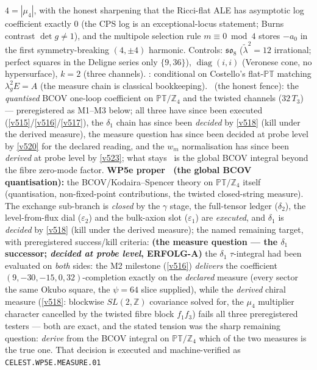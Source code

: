 \documentclass[11pt,a4paper]{article}
\newcommand{\Z}{\mathbb Z}
\begin{document}
\begin{itemize}
\begin{itemize}
$4=|\mu_4|$, with the honest sharpening that the Ricci-flat ALE has asymptotic log coefficient
exactly $0$ (the CPS log is an exceptional-locus statement; Burns contrast $\det g\neq1$), and
the multipole selection rule $m\equiv0\bmod4$ stores $-a_0$ in the first symmetry-breaking
$(4,\pm4)$ harmonic. Controls: $\mathfrak{so}_8$ ($\tilde\lambda^2=12$ irrational; perfect
squares in the Deligne series only $\{9,36\}$), $\operatorname{diag}(i,i)$ (Veronese cone, no
hypersurface), $k=2$ (three channels). \mC: conditional on Costello's flat-$\mathbb{PT}$
matching $\lambda_g^2E=A$ (the measure chain is classical bookkeeping). \mO\ (the honest fence):
the \emph{quantised} BCOV one-loop coefficient on $\mathbb{PT}/\Z_4$ and the twisted channels
($32\,T_3$) --- preregistered as M1--M3 below; all three have since been executed
(\vref{v515}/\vref{v516}/\vref{v517}), the $\delta_1$ chain has since been \emph{decided}
by \vref{v518} (kill under the derived measure), the measure question has since been
decided at probe level by \vref{v520} for the declared reading, and the $w_m$ normalisation
has since been \emph{derived} at probe level by \vref{v523}; what stays \mO\ is the global
BCOV integral beyond the fibre zero-mode factor.
\textbf{WP5e proper \mO\ (the global BCOV
quantisation):} the BCOV/Kodaira--Spencer theory on $\mathbb{PT}/\Z_4$ itself (quantisation,
non-fixed-point contributions, the twisted closed-string measure). The exchange sub-branch is
\emph{closed} by the $\gamma$ stage, the full-tensor ledger ($\delta_2$), the level-from-flux
dial ($\varepsilon_2$) and the bulk-axion slot ($\varepsilon_1$) are \emph{executed}, and
$\delta_1$ is \emph{decided} by \vref{v518} (kill under the derived measure); the named
remaining target, with preregistered success/kill criteria:
\textbf{(the measure question --- the $\delta_1$ successor; \emph{decided at probe level},
ERFOLG-A)} the $\delta_1$ $\tau$-integral had
been evaluated on \emph{both} sides: the M2 milestone (\vref{v516}) \emph{delivers} the
coefficient $(9,-30,-15,0,32)$-completion exactly on the \emph{declared} measure (every sector
the same Okubo square, the $\psi=64$ slice supplied), while the \emph{derived} chiral measure
(\vref{v518}: blockwise $SL(2,\Z)$ covariance solved for, the $\mu_4$ multiplier character
cancelled by the twisted fibre block $f_1f_3$) fails all three preregistered testers --- both
are exact, and the stated tension was the sharp remaining question: \emph{derive} from the BCOV
integral on $\mathbb{PT}/\Z_4$ which of the two measures is the true one. That decision is
executed and machine-verified as \texttt{CELEST.WP5E.MEASURE.01}

\end{itemize}
\end{itemize}
\end{document}
